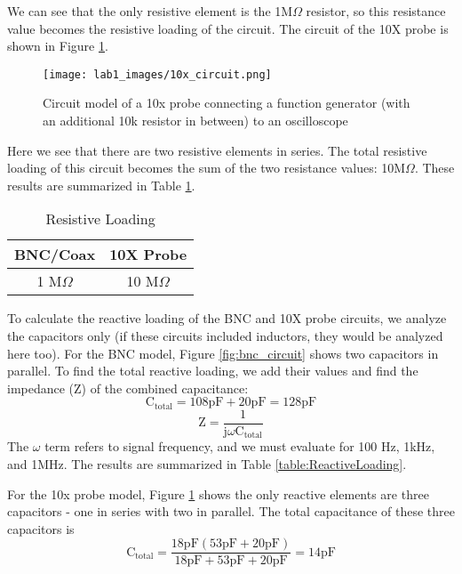 \documentclass[12pt,letterpaper]{report}
\begin{document}
We can see that the only resistive element is the 1M$\Omega$ resistor, so this resistance value becomes the resistive loading of the circuit. The circuit of the 10X probe is shown in Figure \ref{fig:probe_circuit}.

\begin{figure}
	\centering
	\texttt{[image: lab1\_images/10x\_circuit.png]} 
	\caption{Circuit model of a 10x probe connecting a function generator (with an additional 10k resistor in between) to an oscilloscope}
	\label{fig:probe_circuit}
\end{figure}
 
Here we see that there are two resistive elements in series. The total resistive loading of this circuit becomes the sum of the two resistance values: 10M$\Omega$. These results are summarized in Table \ref{table:ResistiveLoading}.

\begin{center}
\begin{table}[ht]
\caption{Resistive Loading} %
\centering 
	\begin{tabular}{| c | c |}
	\hline
	
	BNC/Coax & 10X Probe \\
	\hline
	1 M$\Omega $ & 10 M$\Omega$ \\

	\hline
	\end{tabular}
	\label{table:ResistiveLoading}
\end{table}
\end{center}

To calculate the reactive loading of the BNC and 10X probe circuits, we analyze the capacitors only (if these circuits included inductors, they would be analyzed here too). For the BNC model, Figure \ref{fig:bnc_circuit} shows two capacitors in parallel. To find the total reactive loading, we add their values and find the impedance (Z) of the combined capacitance:
$$ \text{C}_{\text{total}} = 108 \text{pF} + 20 \text{pF} = 128 \text{pF} $$
$$ \text{Z} = \frac{1}{\text{j}\omega\text{C}_{\text{total}}} $$
The $\omega$ term refers to signal frequency, and we must evaluate for 100 Hz, 1kHz, and 1MHz. The results are summarized in Table \ref{table:ReactiveLoading}.

For the 10x probe model, Figure \ref{fig:probe_circuit} shows the only reactive elements are three capacitors - one in series with two in parallel. The total capacitance of these three capacitors is
$$ \text{C}_{\text{total}} = \frac{18 \text{pF} (53 \text{pF} + 20 \text{pF})}{18 \text{pF} + 53 \text{pF} + 20 \text{pF}} = 14 \text{pF} $$
\end{document}
